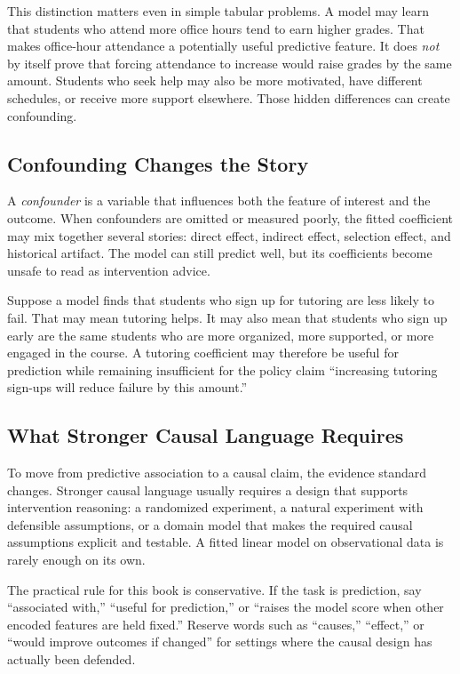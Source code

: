 This distinction matters even in simple tabular problems. A model may learn that students who attend more office hours tend to earn higher grades. That makes office-hour attendance a potentially useful predictive feature. It does \emph{not} by itself prove that forcing attendance to increase would raise grades by the same amount. Students who seek help may also be more motivated, have different schedules, or receive more support elsewhere. Those hidden differences can create confounding.

\subsection{Confounding Changes the Story}

A \emph{confounder} is a variable that influences both the feature of interest and the outcome. When confounders are omitted or measured poorly, the fitted coefficient may mix together several stories: direct effect, indirect effect, selection effect, and historical artifact. The model can still predict well, but its coefficients become unsafe to read as intervention advice.

\begin{example}
Suppose a model finds that students who sign up for tutoring are less likely to fail. That may mean tutoring helps. It may also mean that students who sign up early are the same students who are more organized, more supported, or more engaged in the course. A tutoring coefficient may therefore be useful for prediction while remaining insufficient for the policy claim ``increasing tutoring sign-ups will reduce failure by this amount.'' 
\end{example}

\subsection{What Stronger Causal Language Requires}

To move from predictive association to a causal claim, the evidence standard changes. Stronger causal language usually requires a design that supports intervention reasoning: a randomized experiment, a natural experiment with defensible assumptions, or a domain model that makes the required causal assumptions explicit and testable. A fitted linear model on observational data is rarely enough on its own.

The practical rule for this book is conservative. If the task is prediction, say ``associated with,'' ``useful for prediction,'' or ``raises the model score when other encoded features are held fixed.'' Reserve words such as ``causes,'' ``effect,'' or ``would improve outcomes if changed'' for settings where the causal design has actually been defended.

